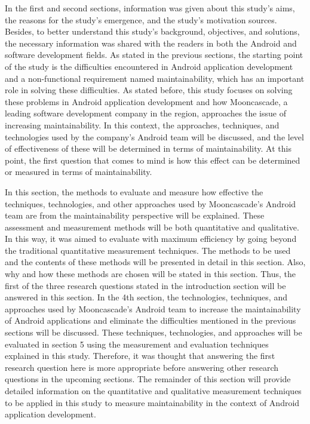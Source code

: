 In the first and second sections, information was given about this study's aims, the reasons for the study's emergence, and the study's motivation sources. Besides, to better understand this study's background, objectives, and solutions, the necessary information was shared with the readers in both the Android and software development fields. As stated in the previous sections, the starting point of the study is the difficulties encountered in Android application development and a non-functional requirement named maintainability, which has an important role in solving these difficulties. As stated before, this study focuses on solving these problems in Android application development and how Mooncascade, a leading software development company in the region, approaches the issue of increasing maintainability. In this context, the approaches, techniques, and technologies used by the company's Android team will be discussed, and the level of effectiveness of these will be determined in terms of maintainability. At this point, the first question that comes to mind is how this effect can be determined or measured in terms of maintainability.

In this section,  the methods to evaluate and measure how effective the techniques, technologies, and other approaches used by Mooncascade's Android team are from the maintainability perspective will be explained. These assessment and measurement methods will be both quantitative and qualitative. In this way, it was aimed to evaluate with maximum efficiency by going beyond the traditional quantitative measurement techniques. The methods to be used and the contents of these methods will be presented in detail in this section. Also, why and how these methods are chosen will be stated in this section. Thus, the first of the three research questions stated in the introduction section will be answered in this section. In the 4th section, the technologies, techniques, and approaches used by Mooncascade's Android team to increase the maintainability of Android applications and eliminate the difficulties mentioned in the previous sections will be discussed. These techniques, technologies, and approaches will be evaluated in section 5 using the measurement and evaluation techniques explained in this study. Therefore, it was thought that answering the first research question here is more appropriate before answering other research questions in the upcoming sections. The remainder of this section will provide detailed information on the quantitative and qualitative measurement techniques to be applied in this study to measure maintainability in the context of Android application development. 

